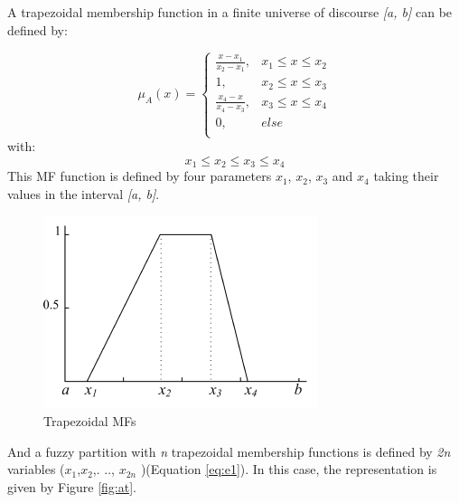 \documentclass[conference]{IEEEtran}
\begin{document}
A trapezoidal membership function in a finite universe of discourse \textit{[a, b]} can be defined by:

\begin{equation}
\mu_{A}(x)= \left \{
\begin{array}{ll}
\frac{x - x_{1}}{x_{2} - x_{1}},& x_{1} \leq x \leq x_{2}\\
1 , &x_{2} \leq x \leq x_{3}\\
\frac{x_{4} - x}{x_{4} - x_{3}},& x_{3} \leq x \leq x_{4}\\
0        ,& else\\	
\end{array}
\right.
\label{eq:trapmf}
\end{equation}
with:
\begin{equation}
x_{1} \leq x_{2} \leq x_{3} \leq x_{4}
\end{equation}
This MF function is defined by four parameters $x_{1}$, $x_{2}$,
$x_{3}$ and $x_{4}$ taking their values in the interval \textit{[a,
  b]}.%

\begin{figure}[!ht] 
	\begin{center}
		\includegraphics[scale=0.5]{fig/trapese}
		\caption {Trapezoidal MFs}
		\label{fig:trapeze}
	\end{center}
\end{figure}
And a fuzzy partition with \textit{n} trapezoidal membership functions
is defined by \textit{2n} variables ($x_{1}$,$x_{2}
$,. .., $x_{2n} $ )(Equation \ref{eq:e1}). In this case,
the representation is given by Figure \ref{fig:at}.
\end{document}
